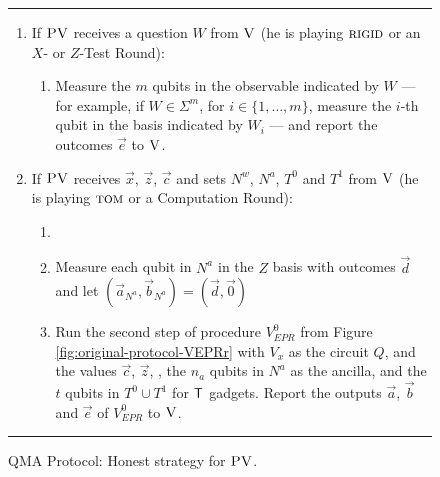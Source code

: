 \begin{figure}[H]
\rule[1ex]{\textwidth}{0.5pt}
\vspace{-20pt}
\begin{enumerate}
  \item If $\textsc{PV}$ receives a question ${W}$ from $\textsc{V}$ (he is playing $\textsc{rigid}$ or an $X$- or $Z$-Test Round):
\begin{enumerate}
     \item[]  Measure the $m$ qubits in the observable indicated by $W$ --- for example, if $W\in \Sigma^m$, for $i\in \{1,\ldots,m\}$, measure the $i$-th qubit in the basis indicated by $W_i$ --- and report the outcomes $\vec{e}$ to $\textsc{V}$.
\end{enumerate}

  \item If $\textsc{PV}$ receives $\vec{x}$, $\vec{z}$, $\vec{c}$ and sets $N^w$, $N^a$, $T^0$ and $T^1$ from $\textsc{V}$ (he is playing $\textsc{tom}$ or a Computation Round):
\begin{enumerate}
  \item[] 
  \item[] Measure each qubit in $N^a$ in the $Z$ basis with outcomes $\vec{d}$  and let $(\vec{a}_{N^a},
    \vec{b}_{N^a}) = (\vec{d}, \vec{0} )$ 
	\item[] Run the second step of procedure $V_{EPR}^0$ from Figure
    \ref{fig:original-protocol-VEPRr} with $V_x$ as the circuit $Q$, and the
    values $\vec{c}$, $\vec{z}$, , the $n_a$ qubits in 
        $N^a$ as the ancilla, and the $t$ qubits in $T^0\cup T^1$ for $\sf T$ gadgets. Report the outputs  $\vec{a}$, $\vec{b}$ and $\vec{e}$ of $V_{EPR}^0$ to $\textsc{V}$.
\end{enumerate}
\end{enumerate}
\rule[2ex]{\textwidth}{0.5pt}\vspace{-.5cm}
\caption{QMA Protocol: Honest strategy for $\textsc{PV}$.}\label{fig:qma-protocol-PV}
\end{figure}




